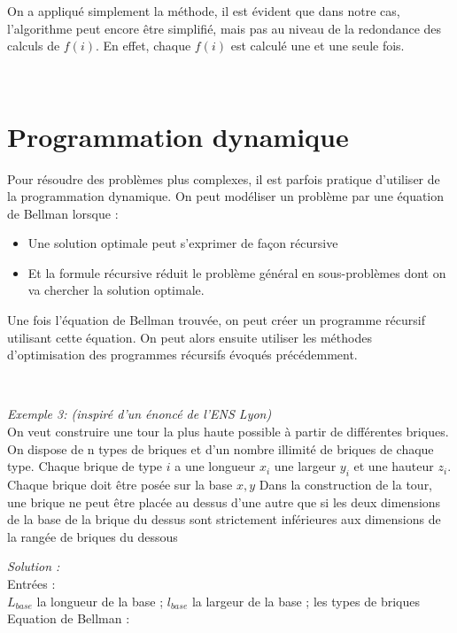 \documentclass[
  paper=a4,
  ,captions=tableheading
]{scrartcl}
\providecommand{\tightlist}{%
  \setlength{\itemsep}{0pt}\setlength{\parskip}{0pt}}
\begin{document}
On a appliqué simplement la méthode, il est évident que dans notre cas,
l'algorithme peut encore être simplifié, mais pas au niveau de la
redondance des calculs de \(f(i)\). En effet, chaque \(f(i)\) est
calculé une et une seule fois.

~\\
\hspace*{0.333em}

\hypertarget{programmation-dynamique}{%
\section{Programmation dynamique}\label{programmation-dynamique}}

Pour résoudre des problèmes plus complexes, il est parfois pratique
d'utiliser de la programmation dynamique. On peut modéliser un problème
par une équation de Bellman lorsque :

\begin{itemize}
\tightlist
\item
  Une solution optimale peut s'exprimer de façon récursive\\
\item
  Et la formule récursive réduit le problème général en sous-problèmes
  dont on va chercher la solution optimale.
\end{itemize}

Une fois l'équation de Bellman trouvée, on peut créer un programme
récursif utilisant cette équation. On peut alors ensuite utiliser les
méthodes d'optimisation des programmes récursifs évoqués précédemment.

~\\
\hspace*{0.333em}

\emph{Exemple 3: (inspiré d'un énoncé de l'ENS Lyon)}\\
On veut construire une tour la plus haute possible à partir de
différentes briques. On dispose de n types de briques et d'un nombre
illimité de briques de chaque type. Chaque brique de type \(i\) a une
longueur \(x_i\) une largeur \(y_i\) et une hauteur \(z_i\). Chaque
brique doit être posée sur la base \(x,y\) Dans la construction de la
tour, une brique ne peut être placée au dessus d'une autre que si les
deux dimensions de la base de la brique du dessus sont strictement
inférieures aux dimensions de la rangée de briques du dessous

\emph{Solution :}\\
Entrées :\\
\(L_{base}\) la longueur de la base ; \(l_{base}\) la largeur de la base
; les types de briques\\
Equation de Bellman :
\end{document}
